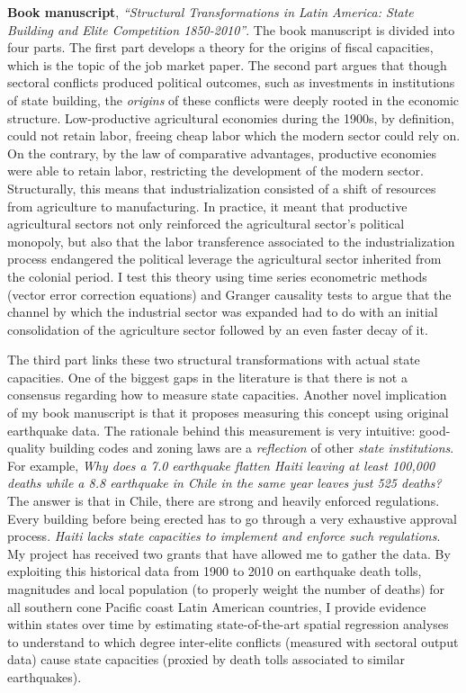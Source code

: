 \documentclass[11pt]{letter} %
\begin{document}
\begin{letter}{}
{\bf Book manuscript}, \emph{``Structural Transformations in Latin America: State Building and Elite Competition 1850-2010''}. The book manuscript is divided into four parts. The first part develops a theory for the origins of fiscal capacities, which is the topic of the job market paper. The second part argues that though sectoral conflicts produced political outcomes, such as investments in institutions of state building, the \emph{origins} of these conflicts were deeply rooted in the economic structure. Low-productive agricultural economies during the 1900s, by definition, could not retain labor, freeing cheap labor which the modern sector could rely on. On the contrary, by the law of comparative advantages, productive economies were able to retain labor, restricting the development of the modern sector. Structurally, this means that industrialization consisted of a shift of resources from agriculture to manufacturing. In practice, it meant that productive agricultural sectors not only reinforced the agricultural sector's political monopoly, but also that the labor transference associated to the industrialization process endangered the political leverage the agricultural sector inherited from the colonial period. I test this theory using time series econometric methods (vector error correction equations) and Granger causality tests to argue that the channel by which the industrial sector was expanded had to do with an initial consolidation of the agriculture sector followed by an even faster decay of it.


The third part links these two structural transformations with actual state capacities. One of the biggest gaps in the literature is that there is not a consensus regarding how to measure state capacities. Another novel implication of my book manuscript is that it proposes measuring this concept using original earthquake data. The rationale behind this measurement is very intuitive: good-quality building codes and zoning laws are a \emph{reflection} of other \emph{state institutions}. For example, \emph{Why does a 7.0 earthquake flatten Haiti leaving at least 100,000 deaths while a 8.8 earthquake in Chile in the same year leaves just 525 deaths?} The answer is that in Chile, there are strong and heavily enforced regulations. Every building before being erected has to go through a very exhaustive approval process. \emph{Haiti lacks state capacities to implement and enforce such regulations}. My project has received two grants that have allowed me to gather the data. By exploiting this historical data from 1900 to 2010 on earthquake death tolls, magnitudes and local population (to properly weight the number of deaths) for all southern cone Pacific coast Latin American countries, I provide evidence within states over time by estimating state-of-the-art spatial regression analyses to understand to which degree inter-elite conflicts (measured with sectoral output data) cause state capacities (proxied by death tolls associated to similar earthquakes). 


\end{letter}
\end{document}
